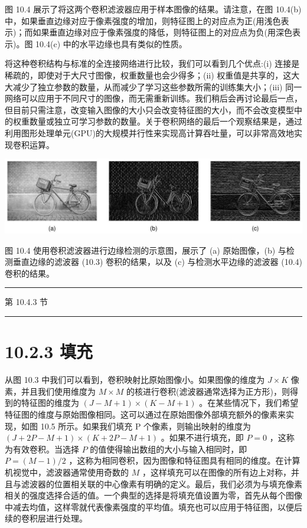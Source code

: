 \documentclass[10pt]{report}
\newcommand{\HRule}{\begin{center}\rule{0.9\linewidth}{0.2mm}\end{center}}
\begin{document}
图 10.4 展示了将这两个卷积滤波器应用于样本图像的结果。请注意，在图 10.4(b) 中，如果垂直边缘对应于像素强度的增加，则特征图上的对应点为正(用浅色表示)；而如果垂直边缘对应于像素强度的降低，则特征图上的对应点为负(用深色表示)。图 10.4(c) 中的水平边缘也具有类似的性质。

将这种卷积结构与标准的全连接网络进行比较，我们可以看到几个优点:(i) 连接是稀疏的，即使对于大尺寸图像，权重数量也会少得多；(ii) 权重值是共享的，这大大减少了独立参数的数量，从而减少了学习这些参数所需的训练集大小；(iii) 同一网络可以应用于不同尺寸的图像，而无需重新训练。我们稍后会再讨论最后一点，但目前只需注意，改变输入图像的大小只会改变特征图的大小，而不会改变模型中的权重数量或独立可学习参数的数量。关于卷积网络的最后一个观察结果是，通过利用图形处理单元(GPU)的大规模并行性来实现高计算吞吐量，可以非常高效地实现卷积运算。

\begin{center}
\includegraphics[max width=1.0\textwidth]{images/0194e279-9b28-703a-88f4-c3ac21e2010d_312_220_1537_1356_342_0.jpg}
\end{center}
\hspace*{3em} 

图 10.4 使用卷积滤波器进行边缘检测的示意图，展示了 (a) 原始图像，(b) 与检测垂直边缘的滤波器 (10.3) 卷积的结果，以及 (c) 与检测水平边缘的滤波器 (10.4) 卷积的结果。

\HRule

第 10.4.3 节

\HRule

\section*{10.2.3 填充}

从图 10.3 中我们可以看到，卷积映射比原始图像小。如果图像的维度为 \(J \times  K\) 像素，并且我们使用维度为 \(M \times  M\) 的核进行卷积(滤波器通常选择为正方形)，则得到的特征图的维度为 \(\left( {J - M + 1}\right)  \times  \left( {K - M + 1}\right)\) 。在某些情况下，我们希望特征图的维度与原始图像相同。这可以通过在原始图像外部填充额外的像素来实现，如图 10.5 所示。如果我们填充 P 个像素，则输出映射的维度为 \(\left( {J + {2P} - M + 1}\right)  \times  \left( {K + {2P} - M + 1}\right)\) 。如果不进行填充，即 \(P = 0\) ，这称为有效卷积。当选择 \(P\) 的值使得输出数组的大小与输入相同时，即 \(P = \left( {M - 1}\right) /2\) ，这称为相同卷积，因为图像和特征图具有相同的维度。在计算机视觉中，滤波器通常使用奇数的 \(M\) ，这样填充可以在图像的所有边上对称，并且与滤波器的位置相关联的中心像素有明确的定义。最后，我们必须为与填充像素相关的强度选择合适的值。一个典型的选择是将填充值设置为零，首先从每个图像中减去均值，这样零就代表像素强度的平均值。填充也可以应用于特征图，以便后续的卷积层进行处理。
\end{document}
